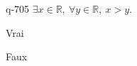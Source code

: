 \begin{truefalse}{q-705}
$\exists x \in \mathbb R,\:\forall y \in \mathbb R,\: x>y$.
\item Vrai
\item* Faux
\end{truefalse}

